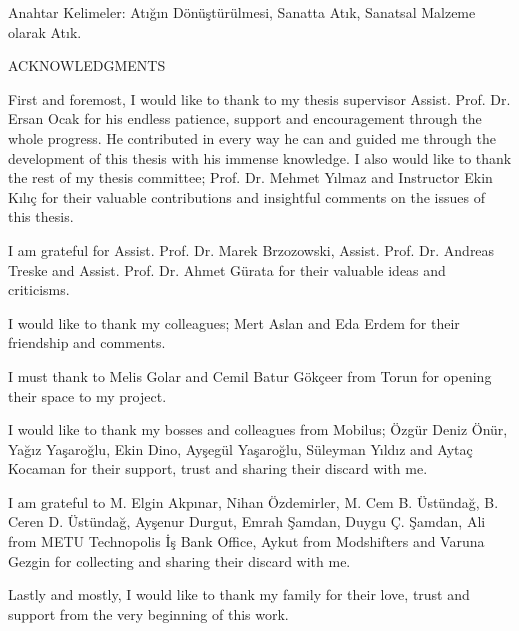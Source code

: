 \documentclass[12pt]{report}
\begin{document}
\noindent Anahtar Kelimeler: Atığın Dönüştürülmesi, Sanatta Atık, Sanatsal Malzeme olarak Atık.
\clearpage


\thispagestyle{plain}
{}
\doublespacing
\begin{center}
	\vspace*{25mm}
	\MakeUppercase{ACKNOWLEDGMENTS}\\
    \vspace{3\baselineskip}
\end{center}
\par First and foremost, I would like to thank to my thesis supervisor Assist. Prof. Dr. Ersan Ocak for his endless patience, support and encouragement through the whole progress. He contributed in every way he can and guided me through the development of this thesis with his immense knowledge. I also would like to thank the rest of my thesis committee; Prof. Dr. Mehmet Yılmaz and Instructor Ekin Kılıç for their valuable contributions and insightful comments on the issues of this thesis.

I am grateful for Assist. Prof. Dr. Marek Brzozowski, Assist. Prof. Dr. Andreas Treske and Assist. Prof. Dr. Ahmet Gürata for their valuable ideas and criticisms.

I would like to thank my colleagues; Mert Aslan and Eda Erdem for their friendship and comments. 

I must thank to Melis Golar and Cemil Batur Gökçeer from Torun for opening their space to my project. 

I would like to thank my bosses and colleagues from Mobilus; Özgür Deniz Önür, Yağız Yaşaroğlu, Ekin Dino, Ayşegül Yaşaroğlu, Süleyman Yıldız and Aytaç Kocaman for their support, trust and sharing their discard with me.

I am grateful to M. Elgin Akpınar, Nihan Özdemirler, M. Cem B. Üstündağ, B. Ceren D. Üstündağ, Ayşenur Durgut, Emrah Şamdan, Duygu Ç. Şamdan, Ali from METU Technopolis İş Bank Office, Aykut from Modshifters and Varuna Gezgin for collecting and sharing their discard with me. 

Lastly and mostly, I would like to thank my family for their love, trust and support from the very beginning of this work. 
\clearpage


{}
\end{document}
